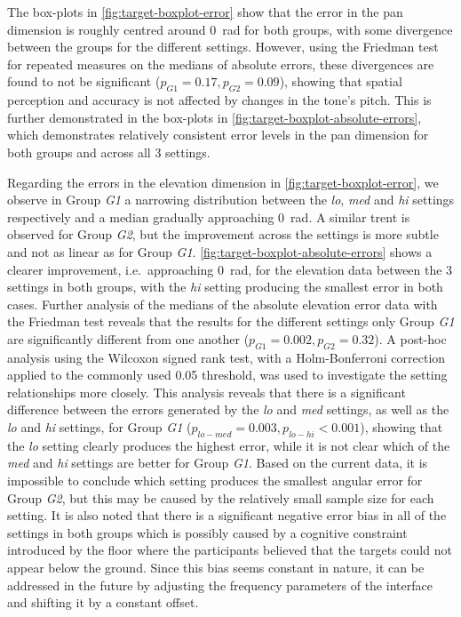 \documentclass[]{interact}
\begin{document}
The box-plots in \cref{fig:target-boxplot-error} show that the error in the pan dimension is roughly centred around \SI{0}{\radian} for both groups, with some divergence between the groups for the different settings.
However, using the Friedman test for repeated measures on the medians of absolute errors, these divergences are found to not be significant ($p_{G1} = 0.17, p_{G2} = 0.09$), showing that spatial perception and accuracy is not affected by changes in the tone's pitch.
This is further demonstrated in the box-plots in \cref{fig:target-boxplot-absolute-errors}, which demonstrates relatively consistent error levels in the pan dimension for both groups and across all 3 settings. 

Regarding the errors in the elevation dimension in \cref{fig:target-boxplot-error}, we observe in Group \textit{G1} a narrowing distribution between the \textit{lo}, \textit{med} and \textit{hi} settings respectively and a median gradually approaching \SI{0}{\radian}.
A similar trent is observed for Group \textit{G2}, but the improvement across the settings is more subtle and not as linear as for Group \textit{G1}.
\cref{fig:target-boxplot-absolute-errors} shows a clearer improvement, i.e.\ approaching \SI{0}{\radian}, for the elevation data between the 3 settings in both groups, with the \textit{hi} setting producing the smallest error in both cases.
Further analysis of the medians of the absolute elevation error data with the Friedman test reveals that the results for the different settings only Group \textit{G1} are significantly different from one another ($p_{G1} = 0.002, p_{G2} = 0.32$).
A post-hoc analysis using the Wilcoxon signed rank test, with a Holm-Bonferroni correction applied to the commonly used 0.05 threshold, was used to investigate the setting relationships more closely. 
This analysis reveals that there is a significant difference between the errors generated by the \textit{lo} and \textit{med} settings, as well as the \textit{lo} and \textit{hi} settings, for Group \textit{G1} ($p_{lo-med} = 0.003, p_{lo-hi} < 0.001$), showing that the \textit{lo} setting clearly produces the highest error, while it is not clear which of the \textit{med} and \textit{hi} settings are better for Group \textit{G1}. 
Based on the current data, it is impossible to conclude which setting produces the smallest angular error for Group \textit{G2}, but this may be caused by the relatively small sample size for each setting. 
It is also noted that there is a significant negative error bias in all of the settings in both groups which is possibly caused by a cognitive constraint introduced by the floor where the participants believed that the targets could not appear below the ground.
Since this bias seems constant in nature, it can be addressed in the future by adjusting the frequency parameters of the interface and shifting it by a constant offset. 
\end{document}
